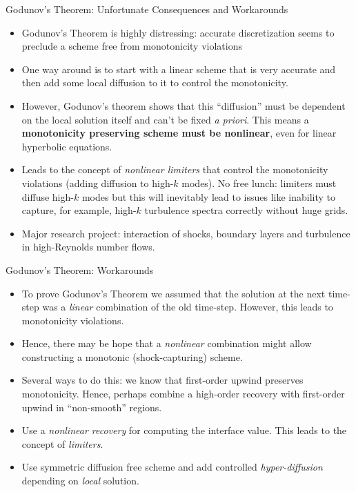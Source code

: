\documentclass[aspectratio=169]{beamer}
\newcommand{\mypause}{\pause}
\begin{document}
\begin{frame}{Godunov's Theorem: Unfortunate Consequences and Workarounds}
  \small%
  \begin{itemize}
  \item Godunov's Theorem is highly distressing: accurate
    discretization seems to preclude a scheme free from monotonicity
    violations
    \mypause%
  \item One way around is to start with a linear scheme that is very
    accurate and then add some local diffusion to it to control the
    monotonicity.%
    \mypause%
  \item However, Godunov's theorem shows that this ``diffusion'' must
    be dependent on the local solution itself and can't be fixed
    \emph{a priori}. This means a {\bf monotonicity preserving scheme
      must be nonlinear}, even for linear hyperbolic equations.%
    \mypause%
  \item Leads to the concept of \emph{nonlinear limiters} that control
    the monotonicity violations (adding diffusion to high-$k$ modes).
    No free lunch: limiters must diffuse high-$k$ modes but this will
    inevitably lead to issues like inability to capture, for example,
    high-$k$ turbulence spectra correctly without huge grids.
  \item Major research project: interaction of shocks, boundary layers
    and turbulence in high-Reynolds number flows.
  \end{itemize}
\end{frame}

\begin{frame}{Godunov's Theorem: Workarounds}
  \begin{itemize}
  \item To prove Godunov's Theorem we assumed that the solution at the
    next time-step was a \emph{linear} combination of the old
    time-step. However, this leads to monotonicity violations.%
    \mypause%
  \item Hence, there may be hope that a \emph{nonlinear} combination
    might allow constructing a monotonic (shock-capturing) scheme.%
    \mypause%
  \item Several ways to do this: we know that first-order upwind
    preserves monotonicity. Hence, perhaps combine a high-order
    recovery with first-order upwind in ``non-smooth'' regions.
    \mypause%
  \item Use a \emph{nonlinear recovery} for computing the interface
    value. This leads to the concept of \emph{limiters}.%
    \mypause%
  \item Use symmetric diffusion free scheme and add controlled
    \emph{hyper-diffusion} depending on \emph{local} solution.
  \end{itemize}

\end{frame}
\end{document}
